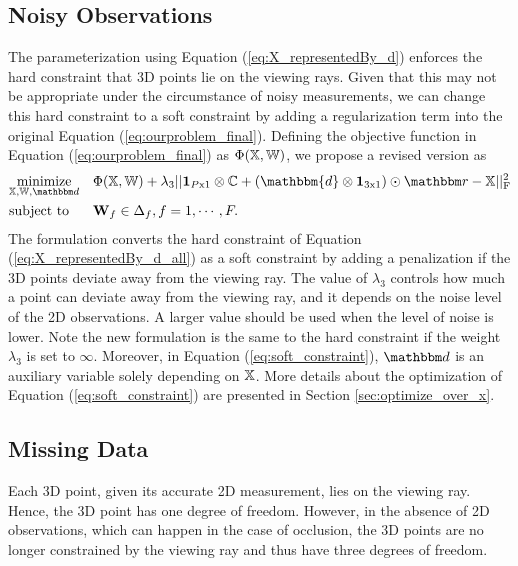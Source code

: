 \subsection{Noisy Observations} \label{sec:noisy_measure}
The parameterization using Equation (\ref{eq:X_representedBy_d}) enforces the hard constraint that 3D points lie on the viewing rays.%
Given that this may not be appropriate under the circumstance of noisy measurements, we can change this hard constraint to a soft constraint by adding a regularization term into the original Equation (\ref{eq:ourproblem_final}). Defining the objective function in Equation (\ref{eq:ourproblem_final}) as $\Phi(\mathbb X,\mathbb W)$, we propose a revised version as
\begin{equation}
\begin{aligned}
& \underset{\allX, \allT, \alld}{\text{minimize}} &&\Phi(\allX,\allT) + 
\lambda_3 ||\mathbf{1}_{P\text{x}1} \otimes \allC + (\mathbbm{d} \otimes \mathbf{1}_{3\text{x}1}) \odot \allr - \allX||_{\text{F}}^2 \\
 & \text{subject to} && \oneT_f \in \Delta_f, f=1,\cdots,F.
\end{aligned}
\label{eq:soft_constraint}
\end{equation}
The formulation converts the hard constraint of Equation (\ref{eq:X_representedBy_d_all}) as a soft constraint by adding a penalization if the 3D points deviate away from the viewing ray. The value of $\lambda_3$ controls how much a point can deviate away from the viewing ray, and it depends on the noise level of the 2D observations. A larger value should be used when the level of noise is lower. Note the new formulation is the same to the hard constraint if the weight $\lambda_3$ is set to $\infty$. Moreover, in Equation (\ref{eq:soft_constraint}), $\alld$ is an auxiliary variable solely depending on $\mathbb X$. More details about the optimization of Equation (\ref{eq:soft_constraint}) are presented in Section \ref{sec:optimize_over_x}.

\subsection{Missing Data} 
Each 3D point, given its accurate 2D measurement, lies on the viewing ray. Hence, the 3D point has one degree of freedom. However, in the absence of 2D observations, which can happen in the case of occlusion, the 3D points are no longer constrained by the viewing ray and thus have three degrees of freedom. 

